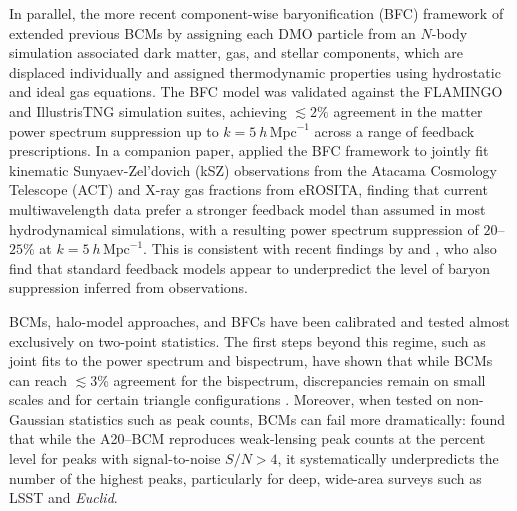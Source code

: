 \documentclass[linenumbers,trackchanges, twocolumn]{aastex701}
\begin{document}
In parallel, the more recent component-wise baryonification (BFC) framework of \citet{Schneider-2025} extended previous BCMs by assigning each DMO particle from an $N$-body simulation associated dark matter, gas, and stellar components, which are displaced individually and assigned thermodynamic properties using hydrostatic and ideal gas equations. The BFC model was validated against the FLAMINGO and IllustrisTNG simulation suites, achieving $\lesssim 2\%$ agreement in the matter power spectrum suppression up to $k = 5~h\,\mathrm{Mpc}^{-1}$ across a range of feedback prescriptions. In a companion paper, \citet{Kovac-2025} applied the BFC framework to jointly fit kinematic Sunyaev-Zel'dovich (kSZ) observations from the Atacama Cosmology Telescope (ACT) and X-ray gas fractions from eROSITA, finding that current multiwavelength data prefer a stronger feedback model than assumed in most hydrodynamical simulations, with a resulting power spectrum suppression of $20$--$25\%$ at $k = 5~h\,\mathrm{Mpc}^{-1}$. This is consistent with recent findings by \citet{Hadzhiyska-2024} and \citet{Bigwood-2024, Siegel-2025}, who also find that standard feedback models appear to underpredict the level of baryon suppression inferred from observations.

BCMs, halo-model approaches, and BFCs have been calibrated and tested almost exclusively on two-point statistics. The first steps beyond this regime, such as joint fits to the power spectrum and bispectrum, have shown that while BCMs can reach $\lesssim 3\%$ agreement for the bispectrum, discrepancies remain on small scales and for certain triangle configurations \citep{Arico-2021a}. Moreover, when tested on non-Gaussian statistics such as peak counts, BCMs can fail more dramatically: \citet{Lee-2023} found that while the A20--BCM reproduces weak-lensing peak counts at the percent level for peaks with signal-to-noise $S/N > 4$, it systematically underpredicts the number of the highest peaks, particularly for deep, wide-area surveys such as LSST and \textit{Euclid}.
\end{document}
